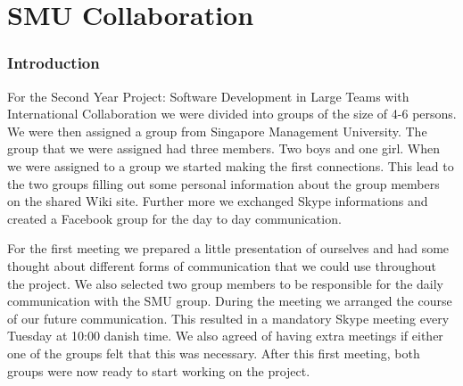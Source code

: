 \part{SMU Collaboration} \label{SmuCollaboration}
\section{Introduction}
For the Second Year Project: Software Development in Large Teams with International Collaboration we were divided into groups of the size of
4-6 persons. We were then assigned a group from Singapore Management University. The group that we were assigned had three members. Two boys and one girl.
When we were assigned to a group we started making the first connections. This lead to the two groups filling out some personal information about
the group members on the shared Wiki site. Further more we exchanged Skype informations and created a Facebook group for the day to day communication.

For the first meeting we prepared a little presentation of ourselves and had some thought about different forms of communication that we could use
throughout the project. We also selected two group members to be responsible for the daily communication with the SMU group. 
During the meeting we arranged the course of our future communication. This resulted in a mandatory Skype meeting every Tuesday at 10:00 danish time.
We also agreed of having extra meetings if either one of the groups felt that this was necessary. After this first meeting, both groups were now ready
to start working on the project.

